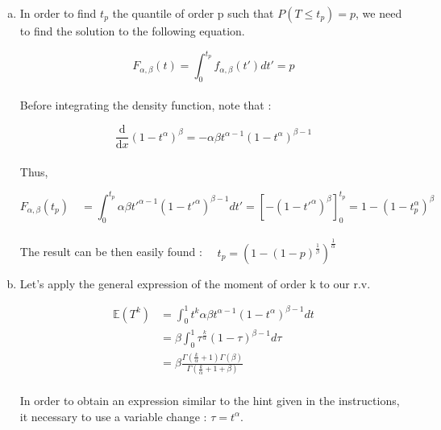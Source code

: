 \documentclass[a4paper]{article}
\begin{document}
\begin{enumerate}[(a)]

\item In order to find $t_{p}$ the quantile of order p such that $ P(T \leq t_{p}) = p $, we need to find the solution to the following equation.

$$F_{\alpha , \beta}(t) = \int_{0}^{t_{p}} f_{\alpha , \beta}(t') dt' = p $$
\\
Before integrating the density function, note that :

$$ \frac{\mathrm{d} }{\mathrm{d} x} (1-t^\alpha)^\beta = - \alpha \beta t^{\alpha-1} (1-t^\alpha)^{\beta -1}$$
\\
Thus,

$$F_{\alpha , \beta} (t_p) \quad = \int_{0}^{t_{p}} \alpha \beta t'^{\alpha-1} (1-t'^\alpha)^{\beta -1} dt' = \left [  -(1-t'^\alpha)^\beta \right ]^{t_{p}}_{0} = 1-(1-t_{p}^{\alpha})^\beta$$
\\
The result can be then easily found : $\quad t_p = (1-(1-p)^{\frac{1}{\beta}})^{\frac{1}{\alpha}}$

\item Let's apply the general expression of the moment of order k to our r.v.

\nonumber
\begin{equation} \label{eq1}
\begin{split}
\mathbb{E}(T^k) & = \int_{0}^{1} t^k \alpha \beta t^{\alpha -1} (1-t^\alpha)^{\beta-1} dt \\
 & = \beta \int_{0}^{1} \tau^{\frac{k}{\alpha}} (1-\tau)^{\beta -1} d\tau \\
 & = \beta \frac{\Gamma(\frac{k}{\alpha}+1)\Gamma(\beta)}{\Gamma(\frac{k}{\alpha}+1+\beta)}
\end{split}
\end{equation}
\\
In order to obtain an expression similar to the hint given in the instructions, it necessary to use a variable change : $\tau = t^\alpha$.


\end{enumerate}
\end{document}
